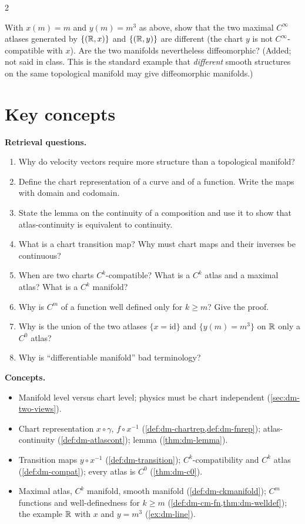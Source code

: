 \begin{paracol}{2}
\begin{exercise}\label{ex:dm-two-structures}
With $x(m)=m$ and $y(m)=m^3$ as above, show that the two maximal $C^\infty$ atlases generated by $\{(\mathbb{R},x)\}$ and
$\{(\mathbb{R},y)\}$ are different (the chart $y$ is not $C^\infty$-compatible with $x$). Are the two manifolds nevertheless
diffeomorphic? (Added; not said in class. This is the standard example that \emph{different} smooth structures on the same
topological manifold may give diffeomorphic manifolds.)
\end{exercise}

\section*{Key concepts}
\begin{keyconcepts}
\textbf{Retrieval questions.}
\begin{enumerate}
  \item Why do velocity vectors require more structure than a topological manifold?
  \item Define the chart representation of a curve and of a function. Write the maps with domain and codomain.
  \item State the lemma on the continuity of a composition and use it to show that atlas-continuity is equivalent to continuity.
  \item What is a chart transition map? Why must chart maps and their inverses be continuous?
  \item When are two charts $C^k$-compatible? What is a $C^k$ atlas and a maximal atlas? What is a $C^k$ manifold?
  \item Why is $C^m$ of a function well defined only for $k\ge m$? Give the proof.
  \item Why is the union of the two atlases $\{x=\mathrm{id}\}$ and $\{y(m)=m^3\}$ on $\mathbb{R}$ only a $C^0$ atlas?
  \item Why is ``differentiable manifold'' bad terminology?
\end{enumerate}
\textbf{Concepts.}
\begin{itemize}
  \item Manifold level versus chart level; physics must be chart independent (\cref{sec:dm-two-views}).
  \item Chart representation $x\circ\gamma$, $f\circ x^{-1}$ (\cref{def:dm-chartrep,def:dm-fnrep}); atlas-continuity
        (\cref{def:dm-atlascont}); lemma (\cref{thm:dm-lemma}).
  \item Transition maps $y\circ x^{-1}$ (\cref{def:dm-transition}); $C^k$-compatibility and $C^k$ atlas
        (\cref{def:dm-compat}); every atlas is $C^0$ (\cref{thm:dm-c0}).
  \item Maximal atlas, $C^k$ manifold, smooth manifold (\cref{def:dm-ckmanifold}); $C^m$ functions and well-definedness
        for $k\ge m$ (\cref{def:dm-cm-fn,thm:dm-welldef}); the example $\mathbb{R}$ with $x$ and $y=m^3$ (\cref{ex:dm-line}).
\end{itemize}
\end{keyconcepts}

\flushside
\end{paracol}
